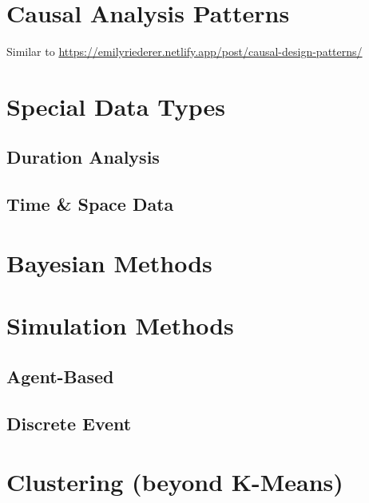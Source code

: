 \documentclass[
]{krantz}
\begin{document}
\hypertarget{causal-analysis-patterns}{%
\section{Causal Analysis Patterns}\label{causal-analysis-patterns}}

Similar to \url{https://emilyriederer.netlify.app/post/causal-design-patterns/}

\hypertarget{special-data-types}{%
\section{Special Data Types}\label{special-data-types}}

\hypertarget{duration-analysis}{%
\subsection{Duration Analysis}\label{duration-analysis}}

\hypertarget{time-space-data}{%
\subsection{Time \& Space Data}\label{time-space-data}}

\hypertarget{bayesian-methods}{%
\section{Bayesian Methods}\label{bayesian-methods}}

\hypertarget{simulation-methods}{%
\section{Simulation Methods}\label{simulation-methods}}

\hypertarget{agent-based}{%
\subsection{Agent-Based}\label{agent-based}}

\hypertarget{discrete-event}{%
\subsection{Discrete Event}\label{discrete-event}}

\hypertarget{clustering-beyond-k-means}{%
\section{Clustering (beyond K-Means)}\label{clustering-beyond-k-means}}
\end{document}
